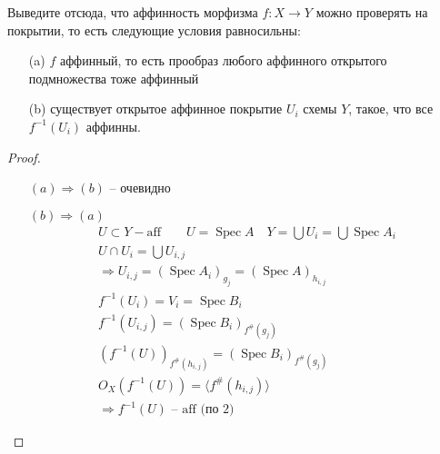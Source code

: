 \begin{prob}
Выведите отсюда, что аффинность морфизма $f: X \rightarrow Y$ можно проверять на покрытии, то есть следующие условия равносильны:
\begin{itemize}
\item[(a)] $f$ аффинный, то есть прообраз любого аффинного открытого подмножества тоже аффинный
\item[(b)] существует открытое аффинное покрытие $U_i$ схемы $Y$, такое, что все $f^{-1}\left(U_i\right)$ аффинны.
\end{itemize}
\end{prob}
\begin{proof}
\begin{itemize}
\item[]
\item[$(a) \Rightarrow (b)$] -- очевидно 
\item[$(b) \Rightarrow (a)$]
    \begin{gather*}
        U \subset Y - \text{aff}\qquad
        U = \operatorname{Spec} A
        \quad Y = \bigcup U_i = \bigcup \operatorname{Spec} A_i\\
        U \cap U_i = \bigcup U_{i,j}\\
        \Rightarrow U_{i,j} = (\operatorname{Spec} A_i)_{g_j} = (\operatorname{Spec} A)_{h_{i,j}}\\
        f^{-1}(U_i) = V_i = \operatorname{Spec} B_i\\
        f^{-1}(U_{i,j}) = (\operatorname{Spec} B_i)_{f^{\#}(g_j)}\\
        (f^{-1}(U))_{f^{\#}(h_{i,j})} = (\operatorname{Spec} B_i)_{f^{\#}(g_j)}\\
        O_X(f^{-1}(U)) = \langle f^{\#}(h_{i,j}) \rangle\\
        \Rightarrow f^{-1}(U) \text{ -- aff (по 2)} 
    \end{gather*}
\end{itemize}
\end{proof}
\vskip 0.6in





